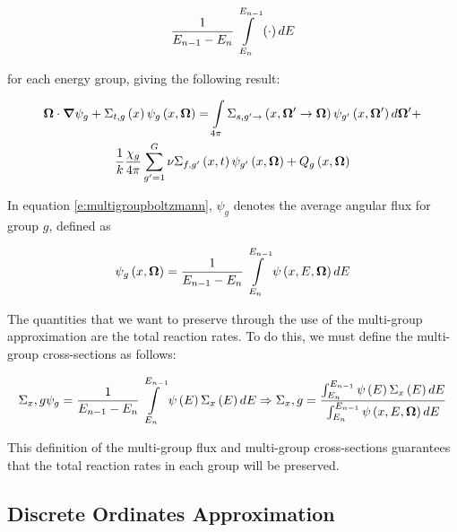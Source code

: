 \begin{equation}
\frac{1}{E_{n-1} - E_n}\intop_{E_n}^{E_{n-1}}\left(\cdot\right)dE
\end{equation}

for each energy group, giving the following result:

\begin{gather}
\bm \Omega \cdot \bm \nabla \psi_g + \Sigma_{t,g}\left(x\right)\psi_g\left(x,\bm \Omega\right) = \intop_{4\pi} \Sigma_{s,g'\rightarrow}\left(x,\bm \Omega' \rightarrow \bm \Omega\right) \psi_{g'}\left(x,\bm \Omega'\right) d\bm \Omega' + \nonumber\\
\frac{1}{k}\frac{\chi_g}{4\pi} \sum_{g'=1}^{G} \nu \Sigma_{f,g'}\left(x,t\right) \psi_{g'}\left(x,\bm \Omega\right) + Q_g\left(x,\bm \Omega\right)\label{e:multigroupboltzmann}
\end{gather}

In equation \ref{e:multigroupboltzmann}, $\psi_g$ denotes the average angular flux for group $g$, defined as

\begin{equation}\label{e:multigroupangflux}
\psi_g\left(x,\bm \Omega\right)=\frac{1}{E_{n-1}-E_n} \intop_{E_n}^{E_{n-1}} \psi\left(x,E,\bm\Omega\right) dE
\end{equation}

The quantities that we want to preserve through the use of the multi-group approximation are the total reaction rates.  To do this, we must define the multi-group cross-sections as follows:

\begin{equation}\label{e:multigroupXS}
\Sigma_x,g \psi_g = \frac{1}{E_{n-1}-E_n} \intop_{E_n}^{E_{n-1}} \psi\left(E\right) \Sigma_x\left(E\right) dE \Rightarrow \Sigma_x,g = \frac{\intop_{E_n}^{E_{n-1}} \psi\left(E\right) \Sigma_x\left(E\right) dE}{\intop_{E_n}^{E_{n-1}} \psi\left(x,E,\bm\Omega\right) dE}
\end{equation}

This definition of the multi-group flux and multi-group cross-sections guarantees that the total reaction rates in each group will be preserved.


\subsection{Discrete Ordinates Approximation}


